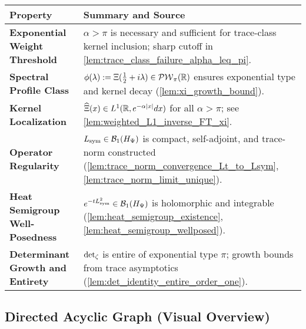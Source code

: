 \begin{center}
\renewcommand{\arraystretch}{1.4}
\begin{tabularx}{\textwidth}{|l|X|}
\hline
\textbf{Property} & \textbf{Summary and Source} \\
\hline
\textbf{Exponential Weight Threshold} & \( \alpha > \pi \) is necessary and sufficient for trace-class kernel inclusion; sharp cutoff in \cref{lem:trace_class_failure_alpha_leq_pi}. \\
\textbf{Spectral Profile Class} & \( \phi(\lambda) := \Xi(\tfrac{1}{2} + i\lambda) \in \mathcal{PW}_{\pi}(\mathbb{R}) \) ensures exponential type and kernel decay (\cref{lem:xi_growth_bound}). \\
\textbf{Kernel Localization} & \( \widehat{\Xi}(x) \in L^1(\mathbb{R}, e^{-\alpha |x|} dx) \) for all \( \alpha > \pi \); see \cref{lem:weighted_L1_inverse_FT_xi}. \\
\textbf{Operator Regularity} & \( L_{\mathrm{sym}} \in \mathcal{B}_1(H_{\Psi}) \) is compact, self-adjoint, and trace-norm constructed (\cref{lem:trace_norm_convergence_Lt_to_Lsym}, \cref{lem:trace_norm_limit_unique}). \\
\textbf{Heat Semigroup Well-Posedness} & \( e^{-tL_{\mathrm{sym}}^2} \in \mathcal{B}_1(H_{\Psi}) \) is holomorphic and integrable (\cref{lem:heat_semigroup_existence}, \cref{lem:heat_semigroup_wellposed}). \\
\textbf{Determinant Growth and Entirety} & \( \det\nolimits_{\zeta} \) is entire of exponential type \( \pi \); growth bounds from trace asymptotics (\cref{lem:det_identity_entire_order_one}). \\
\hline
\end{tabularx}
\end{center}

\subsection*{Directed Acyclic Graph (Visual Overview)}

